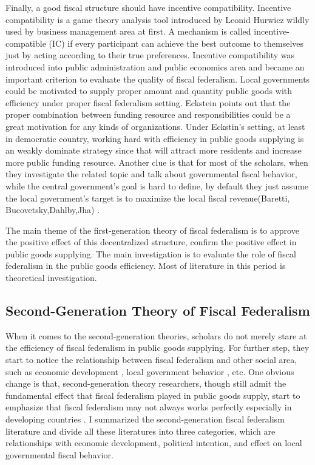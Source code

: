 Finally, a good fiscal structure should have incentive compatibility. Incentive compatibility is a game theory analysis tool introduced by Leonid Hurwicz \cite{hurwicz1973design} wildly used by business management area at first. A mechanism is called incentive-compatible (IC) if every participant can achieve the best outcome to themselves just by acting according to their true preferences. Incentive compatibility was introduced into public administration and public economics area and became an important criterion to evaluate the quality of fiscal federalism. Local governments could be motivated to supply proper amount and quantity public goods with efficiency under proper fiscal federalism setting. Eckstein \cite{eckstein1958water} points out that the proper combination between funding resource and responsibilities could be a great motivation for any kinds of organizations. Under Eckstin's setting, at least in democratic country, working hard with efficiency in public goods supplying is an weakly dominate strategy since that will attract more residents and increase more public funding resource. Another clue is that for most of the scholars, when they  investigate the related topic and talk about governmental fiscal behavior, while the central government's goal is hard to define, by default they just assume the local government's target is to maximize the local fiscal revenue(Baretti, Bucovetsky,Dahlby,Jha) \cite{baretti2002tax,bucovetsky2006efficiency,dahlby2011marginal,jha2000tax}. 

The main theme of the first-generation theory of fiscal federalism is to approve the positive effect of this decentralized structure, confirm the positive effect in public goods supplying. The main investigation is to evaluate the role of fiscal federalism in the public goods efficiency. Most of literature in this period is theoretical investigation. 

\subsection{Second-Generation Theory of Fiscal Federalism}
When it comes to the second-generation theories, scholars do not merely stare at the efficiency of fiscal federalism in public goods supplying. For further step, they start to notice the relationship between fiscal federalism and other social area, such as economic development \cite{cai2005does,barro1991economic}, local government behavior \cite{jin2005regional}, etc. One obvious change is that, second-generation theory researchers, though still admit the fundamental effect that fiscal federalism played in public goods supply, start to emphasize that fiscal federalism may not always works perfectly especially in developing countries \cite{keen1997fiscal,treisman2002decentralization,bardhan2002decentralization,bucovetsky2005public}. I summarized the second-generation fiscal federalism literature and divide all these literatures into three categories, which are relationships with economic development, political intention, and effect on local governmental fiscal behavior.


